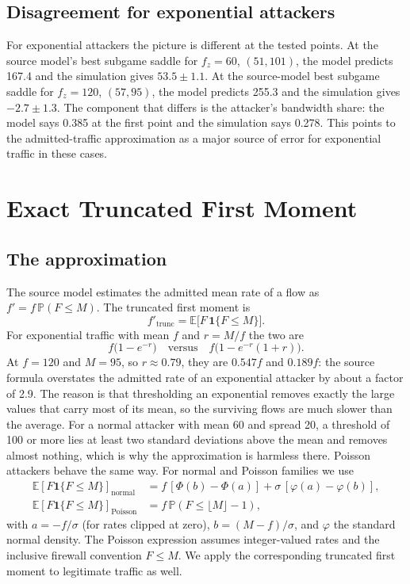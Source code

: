 \documentclass[conference]{IEEEtran}
\renewcommand{\Pr}{\mathbb{P}}
\begin{document}
\subsection{Disagreement for exponential attackers}
For exponential attackers the picture is different at the tested points. At the source model's best subgame saddle for $f_z{=}60$, $(51,101)$, the model predicts 167.4 and the simulation gives $53.5\pm1.1$. At the source-model best subgame saddle for $f_z{=}120$, $(57,95)$, the model predicts 255.3 and the simulation gives $-2.7\pm1.3$. The component that differs is the attacker's bandwidth share: the model says 0.385 at the first point and the simulation says 0.278. This points to the admitted-traffic approximation as a major source of error for exponential traffic in these cases.

\section{Exact Truncated First Moment}\label{sec:exact}

\subsection{The approximation}
The source model estimates the admitted mean rate of a flow as $f'=f\,\Pr(F\le M)$. The truncated first moment is
\begin{equation}
f'_{\text{trunc}}=\mathbb{E}\big[F\,\mathbf 1\{F\le M\}\big].
\end{equation}
For exponential traffic with mean $f$ and $r=M/f$ the two are
\begin{equation}
f\big(1-e^{-r}\big)\quad\text{versus}\quad f\big(1-e^{-r}(1+r)\big).
\end{equation}
At $f{=}120$ and $M{=}95$, so $r\approx0.79$, they are $0.547f$ and $0.189f$: the source formula overstates the admitted rate of an exponential attacker by about a factor of 2.9. The reason is that thresholding an exponential removes exactly the large values that carry most of its mean, so the surviving flows are much slower than the average. For a normal attacker with mean 60 and spread 20, a threshold of 100 or more lies at least two standard deviations above the mean and removes almost nothing, which is why the approximation is harmless there. Poisson attackers behave the same way. For normal and Poisson families we use
\begin{align}
\mathbb{E}[F\mathbf 1\{F\le M\}]_{\text{normal}} &= f\,[\Phi(b)-\Phi(a)]+\sigma\,[\varphi(a)-\varphi(b)],\\
\mathbb{E}[F\mathbf 1\{F\le M\}]_{\text{Poisson}} &= f\,\Pr(F\le\lfloor M\rfloor-1),
\end{align}
with $a=-f/\sigma$ (for rates clipped at zero), $b=(M-f)/\sigma$, and $\varphi$ the standard normal density. The Poisson expression assumes integer-valued rates and the inclusive firewall convention $F\le M$. We apply the corresponding truncated first moment to legitimate traffic as well.
\end{document}
